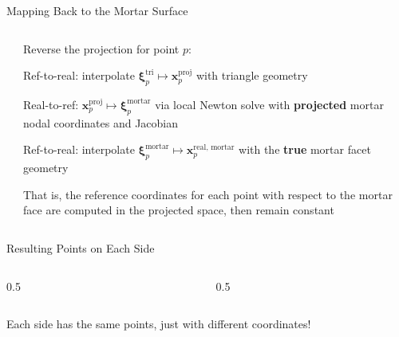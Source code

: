 \documentclass{cubeamer}
\newlength{\textheightwithtitle}
\newlength{\colratioone}
\newlength{\colratiotwo}
\newcommand{\coverflag}{<+->}
\newenvironment{flagitemize}
  {\expandafter\itemize\expandafter[\coverflag]}
  {\enditemize}
\newenvironment{flagenumerate}
  {\expandafter\enumerate\expandafter[\coverflag]}
  {\endenumerate}
\begin{document}
\begin{frame}{Mapping Back to the Mortar Surface}
\begin{columns}
    \begin{column}{\colratioone}
        \only<2>{}
        \only<3>{}
    \end{column}
    \begin{column}{\colratiotwo}
    \begin{flagitemize}
        \item Reverse the projection for point $p$:
        \begin{flagenumerate}
            \item \alert{Ref-to-real}: interpolate $\bm{\xi}_p^{\textrm{tri}}\mapsto \bm{x}_p^{\textrm{proj}}$ with triangle geometry
            \item \alert{Real-to-ref}: $\bm{x}_p^{\textrm{proj}}\mapsto \bm{\xi}_p^{\textrm{mortar}}$ via local Newton solve with \textbf{projected} mortar nodal coordinates and Jacobian
            \item \alert{Ref-to-real}: interpolate $\bm{\xi}_p^{\textrm{mortar}}\mapsto\bm{x}_p^{\textrm{real, mortar}}$ with the \textbf{true} mortar facet geometry
        \end{flagenumerate}
        \item That is, the reference coordinates for each point with respect to the mortar face are computed in the projected space, then remain constant
    \end{flagitemize}
    \end{column}
\end{columns}
\end{frame}


\begin{frame}{Resulting Points on Each Side}
\begin{columns}
    \begin{column}{0.5\textwidth}
         \begin{figure}
             \centering
             
         \end{figure}
    \end{column}
    \begin{column}{0.5\textwidth}
        \begin{figure}
             \centering
             
         \end{figure}
    \end{column}
\end{columns}
\centering
Each side has the same points, just with different coordinates!
\end{frame}
\end{document}
